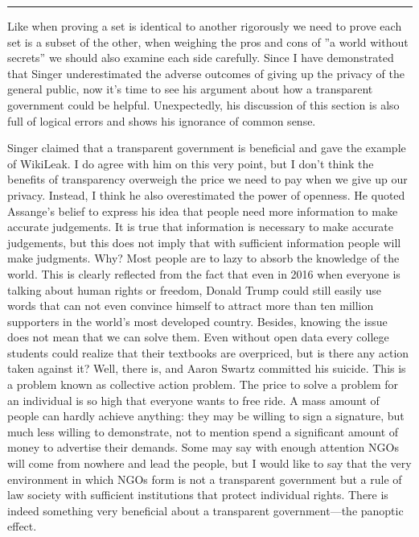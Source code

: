 \documentclass{writing}
\begin{document}
\begin{center}\rule{0.5\linewidth}{\linethickness}\end{center}

Like when proving a set is identical to another rigorously we need to
prove each set is a subset of the other, when weighing the pros and cons
of ''a world without secrets'' we should also examine each side
carefully. Since I have demonstrated that Singer underestimated the
adverse outcomes of giving up the privacy of the general public, now
it's time to see his argument about how a transparent government could
be helpful. Unexpectedly, his discussion of this section is also full of
logical errors and shows his ignorance of common sense.

Singer claimed that a transparent government is beneficial and gave the
example of WikiLeak. I do agree with him on this very point, but I don't
think the benefits of transparency overweigh the price we need to pay
when we give up our privacy. Instead, I think he also overestimated the
power of openness. He quoted Assange's belief to express his idea that
people need more information to make accurate judgements. It is true
that information is necessary to make accurate judgements, but this does
not imply that with sufficient information people will make judgments.
Why? Most people are to lazy to absorb the knowledge of the world. This
is clearly reflected from the fact that even in 2016 when everyone is
talking about human rights or freedom, Donald Trump could still easily
use words that can not even convince himself to attract more than ten
million supporters in the world's most developed country. Besides,
knowing the issue does not mean that we can solve them. Even without
open data every college students could realize that their textbooks are
overpriced, but is there any action taken against it? Well, there is,
and Aaron Swartz committed his suicide. This is a problem known as
collective action problem. The price to solve a problem for an
individual is so high that everyone wants to free ride. A mass amount of
people can hardly achieve anything: they may be willing to sign a
signature, but much less willing to demonstrate, not to mention spend a
significant amount of money to advertise their demands. Some may say
with enough attention NGOs will come from nowhere and lead the people,
but I would like to say that the very environment in which NGOs form is
not a transparent government but a rule of law society with sufficient
institutions that protect individual rights. There is indeed something
very beneficial about a transparent government---the panoptic effect.
\end{document}
